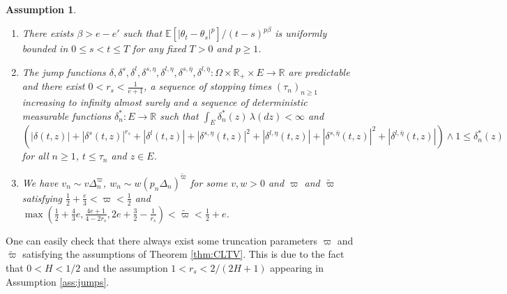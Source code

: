 \documentclass[ecta,nameyear,draft]{econsocart}
\newtheorem{Assumption}{Assumption}
\newtheorem{rem}{Remark}
\def\wt{\widetilde}
\newcommand{\1}{\mathbf 1}
\def\E{\mathbb{E}}
\newcommand{\calE}{\mathcal{E}}
\newcommand{\jump}{\delta}
\numberwithin{equation}{section}
\newcommand{\R}{\mathbb{R}}
\newcommand{\ov}{\overline}
\begin{document}
\begin{appendix}
\begin{Assumption}
\begin{enumerate}
		
		\item[(iv)]  There exists $\beta > e - e'$ such that ${\E[ |\theta_t - \theta_s|^p ]}/{(t-s)^{p\beta}}$ is uniformly bounded in $0\leq s< t\leq T$ for any fixed $T>0$ and $p\geq1$.
		\item[(v)] 	%
		The jump functions $\jump,\jump^{s}, \jump^{l}, \jump^{s,\eta}, \jump^{l,\eta}, \jump^{s,\ov\eta}, \jump^{l,\ov\eta}:\Omega \times \mathbb{R}_+ \times E\to \R$ are predictable  and there exist $0<r_s<			  \frac1{e+1}$, a sequence of stopping times $(\tau_n)_{n\geq1}$ increasing to infinity almost surely and a sequence of deterministic measurable functions $\jump^*_n : E \to \mathbb{R}$ such that $\int_E \jump^*_n(z) \, \lambda(dz) < \infty$ and $
			(|\jump(t,z)| + |\jump^{s}(t,z)|^{r_s} + |\jump^{l}(t,z)| + |\jump^{s,\eta}(t,z)|^2 + |\jump^{l,\eta}(t,z)|  + |\jump^{s,\ov\eta}(t,z)|^2 + |\jump^{l,\ov\eta}(t,z)| ) \wedge 1 \leq \jump^*_n(z)$ for all $n\geq1$, $t \leq \tau_n$ and $z\in E$.
		\item[(vi)] We have	$v_n \sim v \Delta_n^\varpi$, 	$w_n \sim w   (p_n\Delta_n)^{\wt \varpi}$ for some $v,w>0$ and $\varpi$ and $\wt\varpi$ satisfying $  \frac12+\frac{e}{3} <\varpi<\frac12$ and $ \max(\frac12+\frac 43 e, \frac{4e+1}{4-2r_s}, 2e+\frac32-\frac1{r_s})< \wt \varpi<\frac12+e$.
	\end{enumerate}
\end{Assumption}

	One can easily check that there always exist some truncation parameters $\varpi$ and $\wt \varpi$ satisfying the assumptions of Theorem \ref{thm:CLTV}. This is due to the fact that $0 < H < 1/2$ and the assumption $1 < r_s < 2 / (2H+1)$ appearing in Assumption \ref{ass:jumps}.




\end{appendix}
\end{document}
